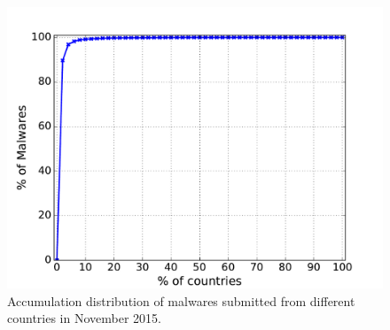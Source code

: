 \begin{figure}[!htb]
  \includegraphics[width=\linewidth]{figure/country}
{Accumulation distribution of malwares submitted from different countries in November 2015.}
\endminipage\hfill

\vspace{-0.1in}
\end{figure}
